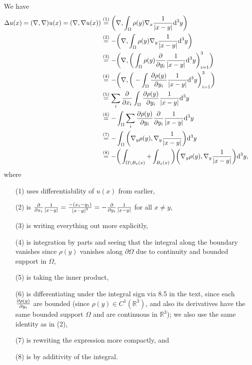 \documentclass[11pt]{article}
\begin{document}
\begin{enumerate}
\begin{enumerate}
        
        We have \begin{align*}
            \Delta u(x) = (\nabla, \nabla)u(x) = (\nabla, \nabla u(x)) &\overset{(1)}{=} \bigg(\nabla, \int_\Omega \rho(y)\nabla_x\frac{1}{\abs{x-y}}\dd^3y\bigg) \\
            &\overset{(2)}{=} -\bigg(\nabla, \int_\Omega \rho(y)\nabla_y\frac{1}{\abs{x-y}}\dd^3y\bigg) \\
            &\overset{(3)}{=} -\bigg(\nabla, \bigg(\int_\Omega \rho(y)\pdv{y_i}\frac{1}{\abs{x-y}}\dd^3y\bigg)_{i=1}^3\bigg)\\
            &\overset{(4)}{=} -\bigg(\nabla, \bigg(-\int_\Omega \pdv{\rho(y)}{y_i}\frac{1}{\abs{x-y}}\dd^3y\bigg)_{i=1}^3\bigg)\\
            &\overset{(5)}{=} \sum_i \pdv{x_i} \int_\Omega \pdv{\rho(y)}{y_i}\frac{1}{\abs{x-y}}\dd^3y\\
            &\overset{(6)}{=} -\int_{\Omega}\sum_i \pdv{\rho(y)}{y_i}\pdv{y_i}\frac{1}{\abs{x-y}}\dd^3y\\
            &\overset{(7)}{=} -\int_{\Omega}\bigg(\nabla_y \rho(y), \nabla_y \frac{1}{\abs{x-y}}\bigg)\dd^3y \\
            &\overset{(8)}{=} -\bigg(\int_{\Omega\setminus B_{\varepsilon}(x)}+\int_{B_{\varepsilon}(x)}\bigg)\bigg(\nabla_y\rho(y),\nabla_y\frac{1}{\abs{x-y}}\bigg)\dd^3y,
        \end{align*} where \begin{enumerate}
            \item[(1)] uses differentiability of $u(x)$ from earlier,
            \item[(2)] is $\pdv{x_i}\frac{1}{\abs{x-y}} = \frac{-(x_i-y_i)}{\abs{x-y}^3} = -\pdv{y_i}\frac{1}{\abs{x-y}}$ for all $x\neq y$,
            \item[(3)] is writing everything out more explicitly,
            \item[(4)] is integration by parts and seeing that the integral along the boundary vanishes since $\rho(y)$ vanishes along $\partial \Omega$ due to continuity and bounded support in $\Omega$, 
            \item[(5)] is taking the inner product,
            \item[(6)] is differentiating under the integral sign via 8.5 in the text, since each $\pdv{\rho(y)}{y_i}$ are bounded (since $\rho(y)\in C^1(\mathbb R^3)$, and also its derivatives have the same bounded support $\Omega$ and are continuous in $\mathbb R^3$); we also use the same identity as in (2),
            \item[(7)] is rewriting the expression more compactly, and
            \item[(8)] is by additivity of the integral.
        \end{enumerate}
        

\end{enumerate}
\end{enumerate}
\end{document}
